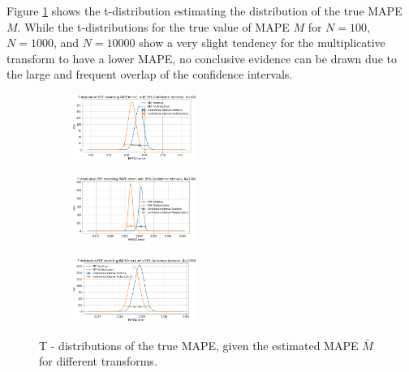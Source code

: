 Figure \ref{fig:Posterior_sigma_transforms} shows the t-distribution estimating the distribution of the true MAPE \(M\). While the t-distributions for the true value of MAPE \(M\) for \(N=100\), \(N=1000\), and \(N=10000\) show a very slight tendency for the multiplicative transform to have a lower MAPE, no conclusive evidence can be drawn due to the large and frequent overlap of the confidence intervals.
\begin{figure}[!htb]
\begin{center}
\begin{subfigure}
    \centering
    \includegraphics[width=0.45\textwidth]{Chap6_EvaluationAndAnalysis/transform_variation/poterior_KR6_transforms_N100.png}
\end{subfigure}
\begin{subfigure}
    \centering
    \includegraphics[width=0.45\textwidth]{Chap6_EvaluationAndAnalysis/transform_variation/poterior_KR6_transforms_N1000.png}
\end{subfigure}
\begin{subfigure}
    \centering
    \includegraphics[width=0.45\textwidth]{Chap6_EvaluationAndAnalysis/transform_variation/poterior_KR6_transforms_N10000.png}
\end{subfigure}
\caption{ T - distributions of the true MAPE, given the estimated MAPE \(\bar{M}\) for different transforms.}
\label{fig:Posterior_sigma_transforms}
\end{center}
\end{figure}

